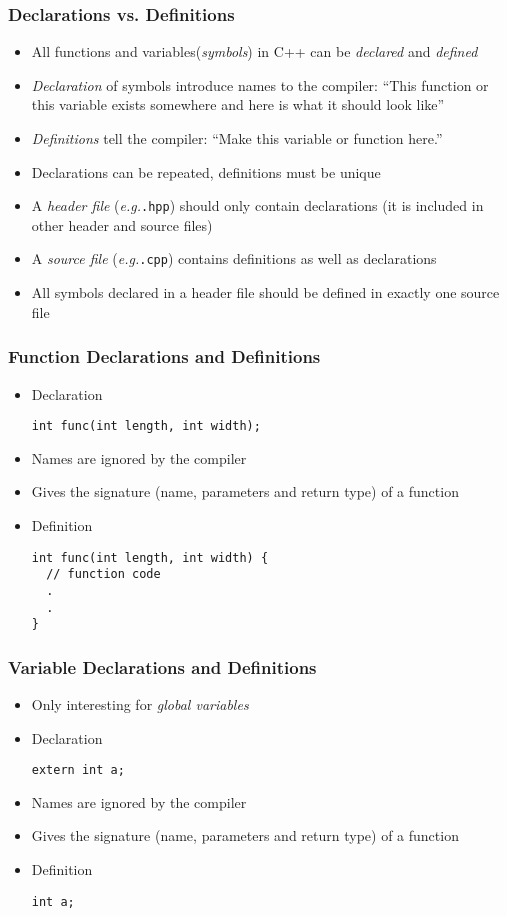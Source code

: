 \documentclass{slides}
\newcommand{\eg}{\textit{e.\thinspace g.}\xspace}
\begin{document}
\begin{frame}
  \frametitle{Declarations vs. Definitions}
  \begin{itemize}
  \item All functions and variables(\emph{symbols}) in C++ can be
    \emph{declared} and \emph{defined}
  \item \emph{Declaration} of symbols introduce names to the compiler:
    ``This function or this variable exists somewhere and here is what
    it should look like''
  \item \emph{Definitions} tell the compiler: ``Make this variable
    or function here.''
  \item Declarations can be repeated, definitions must be unique
  \item A \emph{header file} (\eg \texttt{.hpp}) should only contain
    declarations (it is included in other header and source files)
  \item A \emph{source file} (\eg \texttt{.cpp}) contains definitions
    as well as declarations
  \item All symbols declared in a header file should be defined in
    exactly one source file
  \end{itemize}
\end{frame}

\begin{frame}[fragile]
  \frametitle{Function Declarations and Definitions}
  \begin{itemize}
  \item Declaration
    \begin{lstlisting}
int func(int length, int width);
    \end{lstlisting}
  \item Names are ignored by the compiler
  \item Gives the signature (name, parameters and return type) of a
    function
  \item Definition
    \begin{lstlisting}
int func(int length, int width) {
  // function code
  .
  .
}
    \end{lstlisting}
  \end{itemize}
\end{frame}

\begin{frame}[fragile]
  \frametitle{Variable Declarations and Definitions}
  \begin{itemize}
  \item Only interesting for \emph{global variables}
  \item Declaration
    \begin{lstlisting}
extern int a;
    \end{lstlisting}
  \item Names are ignored by the compiler
  \item Gives the signature (name, parameters and return type) of a
    function
  \item Definition
    \begin{lstlisting}
int a;
    \end{lstlisting}
  \end{itemize}
\end{frame}
\end{document}
